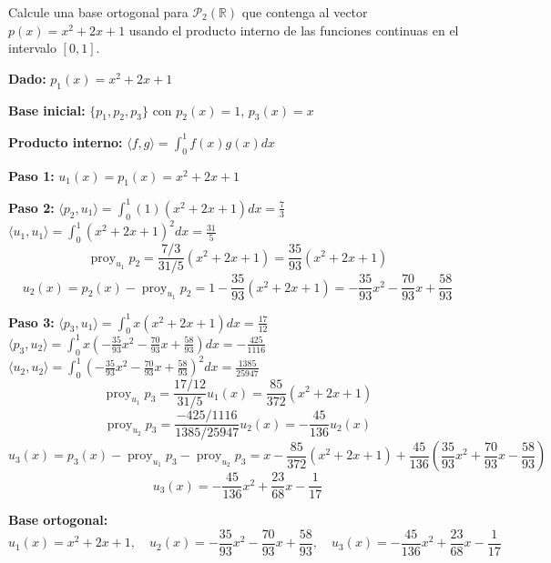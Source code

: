 \begin{prob} 
Calcule una base ortogonal para $\mathcal{P}_{2}(\mathbb{R})$ que contenga al vector $p(x)=x^2+2x+1$ usando el producto interno de las funciones continuas en el intervalo $[0,1].$
\begin{myproof}
\textbf{Dado:} $p_1(x) = x^2 + 2x + 1$

\textbf{Base inicial:} $\{p_1, p_2, p_3\}$ con $p_2(x) = 1$, $p_3(x) = x$

\textbf{Producto interno:} $\langle f, g \rangle = \int_0^1 f(x)g(x)  dx$

\textbf{Paso 1:}  
$u_1(x) = p_1(x) = x^2 + 2x + 1$

\textbf{Paso 2:}  
$\langle p_2, u_1 \rangle = \int_0^1 (1)(x^2 + 2x + 1)  dx = \frac{7}{3}$ \\
$\langle u_1, u_1 \rangle = \int_0^1 (x^2 + 2x + 1)^2  dx = \frac{31}{5}$ \\
\[
\operatorname{proy}_{u_1} p_2 = \frac{7/3}{31/5} (x^2 + 2x + 1) = \frac{35}{93} (x^2 + 2x + 1)
\]
\[
u_2(x) = p_2(x) - \operatorname{proy}_{u_1} p_2 = 1 - \frac{35}{93}(x^2 + 2x + 1) = -\frac{35}{93}x^2 - \frac{70}{93}x + \frac{58}{93}
\]

\textbf{Paso 3:}  
$\langle p_3, u_1 \rangle = \int_0^1 x(x^2 + 2x + 1)  dx = \frac{17}{12}$ \\
$\langle p_3, u_2 \rangle = \int_0^1 x \left( -\frac{35}{93}x^2 - \frac{70}{93}x + \frac{58}{93} \right)  dx = -\frac{425}{1116}$ \\
$\langle u_2, u_2 \rangle = \int_0^1 \left( -\frac{35}{93}x^2 - \frac{70}{93}x + \frac{58}{93} \right)^2  dx = \frac{1385}{25947}$ \\
\[
\operatorname{proy}_{u_1} p_3 = \frac{17/12}{31/5} u_1(x) = \frac{85}{372} (x^2 + 2x + 1)
\]
\[
\operatorname{proy}_{u_2} p_3 = \frac{-425/1116}{1385/25947} u_2(x) = -\frac{45}{136} u_2(x)
\]
\[
u_3(x) = p_3(x) - \operatorname{proy}_{u_1} p_3 - \operatorname{proy}_{u_2} p_3 = x - \frac{85}{372}(x^2 + 2x + 1) + \frac{45}{136} \left( \frac{35}{93}x^2 + \frac{70}{93}x - \frac{58}{93} \right)
\]
\[
u_3(x) = -\frac{45}{136}x^2 + \frac{23}{68}x - \frac{1}{17}
\]

\textbf{Base ortogonal:}
\[
\boxed{u_1(x) = x^2 + 2x + 1, \quad u_2(x) = -\frac{35}{93}x^2 - \frac{70}{93}x + \frac{58}{93}, \quad u_3(x) = -\frac{45}{136}x^2 + \frac{23}{68}x - \frac{1}{17}}
\]
\end{myproof}
\end{prob}




